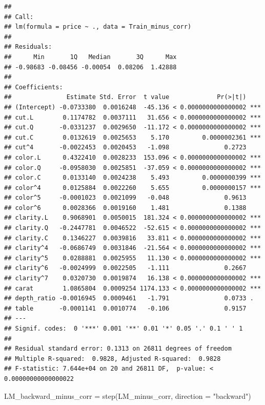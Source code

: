\documentclass[
]{article}
\newenvironment{Shaded}{\begin{snugshade}}{\end{snugshade}}
\newcommand{\AttributeTok}[1]{\textcolor[rgb]{0.77,0.63,0.00}{#1}}
\newcommand{\FunctionTok}[1]{\textcolor[rgb]{0.00,0.00,0.00}{#1}}
\newcommand{\NormalTok}[1]{#1}
\newcommand{\OtherTok}[1]{\textcolor[rgb]{0.56,0.35,0.01}{#1}}
\newcommand{\StringTok}[1]{\textcolor[rgb]{0.31,0.60,0.02}{#1}}
\begin{document}
\begin{verbatim}
##
## Call:
## lm(formula = price ~ ., data = Train_minus_corr)
##
## Residuals:
##      Min       1Q   Median       3Q      Max
## -0.98683 -0.08456 -0.00054  0.08206  1.42888
##
## Coefficients:
##               Estimate Std. Error  t value             Pr(>|t|)
## (Intercept) -0.0733380  0.0016248  -45.136 < 0.0000000000000002 ***
## cut.L        0.1174782  0.0037111   31.656 < 0.0000000000000002 ***
## cut.Q       -0.0331237  0.0029650  -11.172 < 0.0000000000000002 ***
## cut.C        0.0132619  0.0025653    5.170         0.0000002361 ***
## cut^4       -0.0022453  0.0020453   -1.098               0.2723
## color.L      0.4322410  0.0028233  153.096 < 0.0000000000000002 ***
## color.Q     -0.0958030  0.0025851  -37.059 < 0.0000000000000002 ***
## color.C      0.0133140  0.0024238    5.493         0.0000000399 ***
## color^4      0.0125884  0.0022260    5.655         0.0000000157 ***
## color^5     -0.0001023  0.0021099   -0.048               0.9613
## color^6      0.0028366  0.0019160    1.481               0.1388
## clarity.L    0.9068901  0.0050015  181.324 < 0.0000000000000002 ***
## clarity.Q   -0.2447781  0.0046522  -52.615 < 0.0000000000000002 ***
## clarity.C    0.1346227  0.0039816   33.811 < 0.0000000000000002 ***
## clarity^4   -0.0686749  0.0031846  -21.564 < 0.0000000000000002 ***
## clarity^5    0.0288881  0.0025955   11.130 < 0.0000000000000002 ***
## clarity^6   -0.0024999  0.0022505   -1.111               0.2667
## clarity^7    0.0320730  0.0019874   16.138 < 0.0000000000000002 ***
## carat        1.0865804  0.0009254 1174.133 < 0.0000000000000002 ***
## depth_ratio -0.0016945  0.0009461   -1.791               0.0733 .
## table       -0.0001141  0.0010774   -0.106               0.9157
## ---
## Signif. codes:  0 '***' 0.001 '**' 0.01 '*' 0.05 '.' 0.1 ' ' 1
##
## Residual standard error: 0.1313 on 26811 degrees of freedom
## Multiple R-squared:  0.9828, Adjusted R-squared:  0.9828
## F-statistic: 7.644e+04 on 20 and 26811 DF,  p-value: < 0.00000000000000022
\end{verbatim}

\begin{Shaded}
\begin{Highlighting}[]
\NormalTok{LM\_backward\_minus\_corr }\OtherTok{=} \FunctionTok{step}\NormalTok{(LM\_minus\_corr, }\AttributeTok{direction =} \StringTok{"backward"}\NormalTok{)}
\end{Highlighting}
\end{Shaded}
\end{document}
